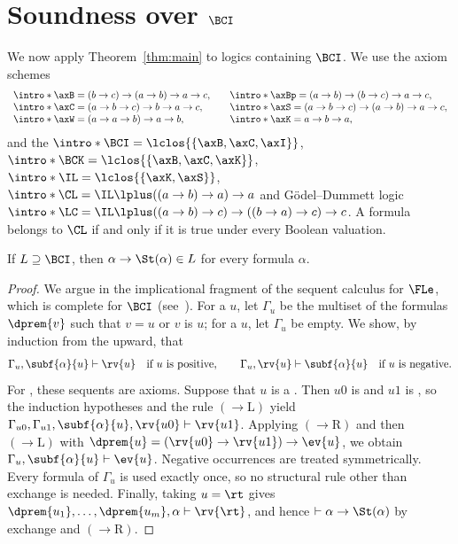 \section{Soundness over \texorpdfstring{$\BCI$}{BCI}}\label{sec:sound}

\AP We now apply Theorem~\ref{thm:main} to logics containing $\BCI$. We use
the axiom schemes
\[
\begin{array}{l@{\qquad}l}
\intro*\axB=(b\to c)\to(a\to b)\to a\to c, & \intro*\axBp=(a\to b)\to(b\to c)\to a\to c,\\
\intro*\axC=(a\to b\to c)\to b\to a\to c, & \intro*\axS=(a\to b\to c)\to(a\to b)\to a\to c,\\
\intro*\axW=(a\to a\to b)\to a\to b, & \intro*\axK=a\to b\to a,
\end{array}
\]
and the  $\intro*\BCI=\lclos{\{\axB,\axC,\axI\}}$,
$\intro*\BCK=\lclos{\{\axB,\axC,\axK\}}$, $\intro*\IL=\lclos{\{\axK,\axS\}}$,
$\intro*\CL=\IL\lplus((a\to b)\to a)\to a$ and Gödel--Dummett
logic~\cite{Dum59} $\intro*\LC=\IL\lplus((a\to b)\to c)\to((b\to a)\to c)\to c$.
A formula belongs to $\CL$ if and only if it is true under every Boolean
valuation.

\begin{lemma}[Soundness]\label{lem:sound}
If $L\supseteq\BCI$, then $\alpha\to\St(\alpha)\in L$ for every
formula $\alpha$.
\end{lemma}
\begin{proof}
We argue in the implicational fragment of the sequent calculus for
$\FLe$, which is complete for $\BCI$ (see~\cite{GJKO07}). For a 
 $u$, let $\Gamma_u$ be the multiset of the formulas
$\dprem{v}$ such that $v=u$ or $v$ is  $u$; for a  $u$, let
$\Gamma_u$ be empty. We show, by induction from the  upward, that
\[
\Gamma_u,\subf{\alpha}{u}\vdash \rv{u}\quad\text{if $u$ is positive},\qquad
\Gamma_u,\rv{u}\vdash\subf{\alpha}{u}\quad\text{if $u$ is negative}.
\]
For , these sequents are axioms. Suppose that $u$ is a 
. Then $u0$ is  and $u1$ is , so the induction
hypotheses and the rule $({\to}\mathrm{L})$ yield
$\Gamma_{u0},\Gamma_{u1},\subf{\alpha}{u},\rv{u0}\vdash \rv{u1}$. Applying
$({\to}\mathrm{R})$ and then $({\to}\mathrm{L})$ with
$\dprem{u}=(\rv{u0}\to \rv{u1})\to \ev{u}$, we obtain $\Gamma_u,\subf{\alpha}{u}\vdash \ev{u}$.
Negative occurrences are treated symmetrically. Every formula of
$\Gamma_u$ is used exactly once, so no structural rule other than exchange
is needed. Finally, taking $u=\rt$ gives
$\dprem{u_1},\dots,\dprem{u_m},\alpha\vdash \rv{\rt}$, and hence
$\vdash\alpha\to\St(\alpha)$ by exchange and $({\to}\mathrm{R})$.
\end{proof}


